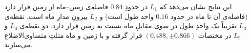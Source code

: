 %
%		
%		
%		
%		
%		
%		
%		

\noindent
این نتایج نشان می‌دهد که $L_{1}$ در حدودِ $0.84$ فاصله‌ی زمین–ماه از زمین قرار دارد (فاصله‌ی آن تا ماه در حدود $0.16$ واحد طول است) و $L_{2}$ بیرونِ مدارِ ماه است. نقطه‌ی $L_{3}$ تقریباً یک واحدِ طول در سوی مقابلِ ماه نسبت به زمین قرار دارد. دو نقطه‌ی $L_{4}$ و $L_{5}$ در مختصات $(0.488,\pm0.866)$ قرار گرفته و با زمین و ماه مثلثِ متساوی‌الاضلاع می‌سازند.
